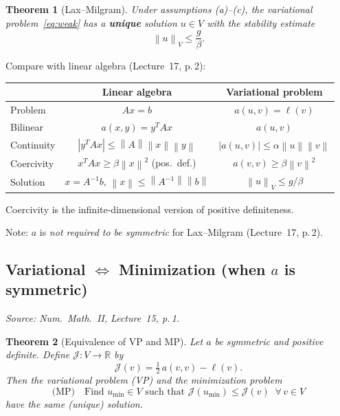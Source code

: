 \documentclass[11pt,a4paper]{article}
\theoremstyle{plain}
\newtheorem{theorem}{Theorem}[section]
\theoremstyle{remark}
\newcommand{\R}{\mathbb{R}}
\newcommand{\norm}[1]{\left\| #1 \right\|}
\let\origsubsection\subsection
\renewcommand{\subsection}{\needspace{6\baselineskip}\origsubsection}
\begin{document}
\begin{theorem}[Lax--Milgram]
Under assumptions (a)--(c), the variational
problem~\eqref{eq:weak} has a \textbf{unique} solution $u \in V$ with
the stability estimate
\[
  \norm{u}_V \leq \frac{g}{\beta}.
\]
\end{theorem}

\begin{intuition}
Compare with linear algebra (Lecture~17, p.\,2):
\begin{center}
\renewcommand{\arraystretch}{1.2}
\begin{tabular}{@{}lcc@{}}
  \toprule
  & \textbf{Linear algebra} & \textbf{Variational problem}\\
  \midrule
  Problem    & $Ax = b$            & $a(u,v) = \ell(v)$\\
  Bilinear   & $a(x,y) = y^T A x$ & $a(u,v)$\\
  Continuity & $|y^T A x| \leq \norm{A}\norm{x}\norm{y}$
             & $|a(u,v)| \leq \alpha\norm{u}\norm{v}$\\
  Coercivity & $x^T A x \geq \beta \norm{x}^2$ (pos.\ def.)
             & $a(v,v) \geq \beta\norm{v}^2$\\
  Solution   & $x = A^{-1}b$, $\norm{x} \leq \norm{A^{-1}}\norm{b}$
             & $\norm{u}_V \leq g/\beta$\\
  \bottomrule
\end{tabular}
\end{center}
Coercivity is the infinite-dimensional version of positive definiteness.
\end{intuition}

Note: $a$ is \emph{not required to be symmetric} for Lax--Milgram
(Lecture~17, p.\,2).

\subsection{Variational $\Leftrightarrow$ Minimization
            (when $a$ is symmetric)}

\textit{Source: Num.\ Math.\ II, Lecture~15, p.\,1.}

\begin{theorem}[Equivalence of VP and MP]
Let $a$ be symmetric and positive definite.  Define
$\mathcal{J}: V \to \R$ by
\[
  \mathcal{J}(v) = \tfrac{1}{2}\,a(v,v) - \ell(v).
\]
Then the variational problem (VP) and the minimization problem
\[
  \text{(MP)}\quad
  \text{Find } u_{\min} \in V \text{ such that }
  \mathcal{J}(u_{\min}) \leq \mathcal{J}(v)
  \;\;\forall\, v \in V
\]
have the same (unique) solution.
\end{theorem}
\end{document}
